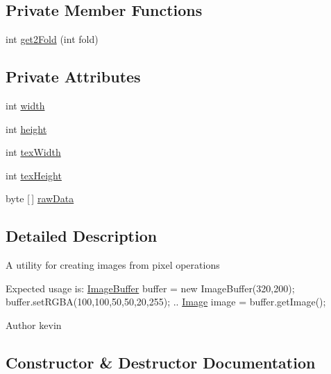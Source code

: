 \subsection*{Private Member Functions}
\begin{DoxyCompactItemize}
\item 
int \mbox{\hyperlink{classorg_1_1newdawn_1_1slick_1_1_image_buffer_aeeb1bc84ab69d8175db88425c42f9945}{get2\+Fold}} (int fold)
\end{DoxyCompactItemize}
\subsection*{Private Attributes}
\begin{DoxyCompactItemize}
\item 
int \mbox{\hyperlink{classorg_1_1newdawn_1_1slick_1_1_image_buffer_a3d1afc42dba7eb1ce006daeec78852f3}{width}}
\item 
int \mbox{\hyperlink{classorg_1_1newdawn_1_1slick_1_1_image_buffer_a3ddd231a45747a547db36fbd23ad426e}{height}}
\item 
int \mbox{\hyperlink{classorg_1_1newdawn_1_1slick_1_1_image_buffer_adff2451214c3b558ed4a5a1aa373441c}{tex\+Width}}
\item 
int \mbox{\hyperlink{classorg_1_1newdawn_1_1slick_1_1_image_buffer_a233e898232a8dcd31df4d8c28c70fb66}{tex\+Height}}
\item 
byte \mbox{[}$\,$\mbox{]} \mbox{\hyperlink{classorg_1_1newdawn_1_1slick_1_1_image_buffer_a868ea7115032600267528b6894d8c8be}{raw\+Data}}
\end{DoxyCompactItemize}


\subsection{Detailed Description}
A utility for creating images from pixel operations

Expected usage is\+: {\ttfamily  \mbox{\hyperlink{classorg_1_1newdawn_1_1slick_1_1_image_buffer}{Image\+Buffer}} buffer = new Image\+Buffer(320,200); buffer.\+set\+R\+G\+B\+A(100,100,50,50,20,255); .. \mbox{\hyperlink{classorg_1_1newdawn_1_1slick_1_1_image}{Image}} image = buffer.\+get\+Image(); }

\begin{DoxyAuthor}{Author}
kevin 
\end{DoxyAuthor}


\subsection{Constructor \& Destructor Documentation}
\mbox{\label{classorg_1_1newdawn_1_1slick_1_1_image_buffer_a1ab7545feb14aa4f36fab52bd898d3a2}} 
